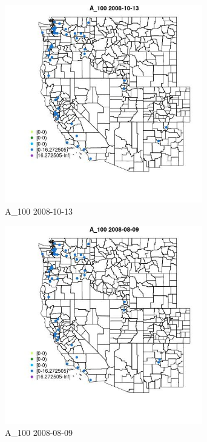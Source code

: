 \begin{figure} 
\centering  
\includegraphics[width=0.77\textwidth]{Code_Outputs/Report_ML_input_PM25_Step4_part_e_de_duplicated_aves_MapObsA_1002008-10-13.jpg} 
\caption{\label{fig:Report_ML_input_PM25_Step4_part_e_de_duplicated_avesMapObsA_1002008-10-13}A_100 2008-10-13} 
\end{figure} 
 

\begin{figure} 
\centering  
\includegraphics[width=0.77\textwidth]{Code_Outputs/Report_ML_input_PM25_Step4_part_e_de_duplicated_aves_MapObsA_1002008-08-09.jpg} 
\caption{\label{fig:Report_ML_input_PM25_Step4_part_e_de_duplicated_avesMapObsA_1002008-08-09}A_100 2008-08-09} 
\end{figure} 
 

